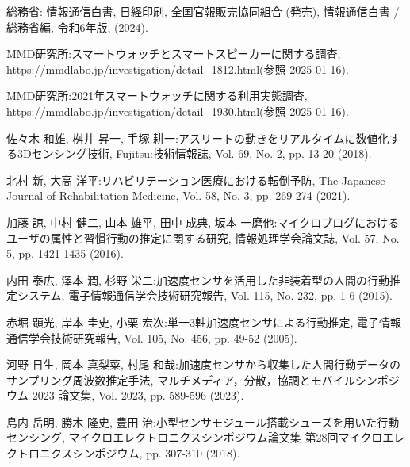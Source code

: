 \thispagestyle{myheadings}
    
\begin{thebibliography}{参考文献}

	総務省: 情報通信白書, 日経印刷, 全国官報販売協同組合 (発売), 情報通信白書 / 総務省編, 令和6年版, (2024).


	MMD研究所:スマートウォッチとスマートスピーカーに関する調査, \url{https://mmdlabo.jp/investigation/detail_1812.html}(参照 2025-01-16).

	MMD研究所:2021年スマートウォッチに関する利用実態調査, \url{https://mmdlabo.jp/investigation/detail_1930.html}(参照 2025-01-16).

	佐々木 和雄, 桝井 昇一, 手塚 耕一:アスリートの動きをリアルタイムに数値化する3Dセンシング技術, Fujitsu:技術情報誌, Vol. 69, No. 2, pp. 13-20 (2018).

	北村 新, 大高 洋平:リハビリテーション医療における転倒予防, The Japanese Journal of Rehabilitation Medicine, Vol. 58, No. 3, pp. 269-274 (2021).
	

	加藤 諒, 中村 健二, 山本 雄平, 田中 成典, 坂本 一磨他:マイクロブログにおけるユーザの属性と習慣行動の推定に関する研究, 情報処理学会論文誌, Vol. 57, No. 5, pp. 1421-1435 (2016).

	内田 泰広, 澤本 潤, 杉野 栄二:加速度センサを活用した非装着型の人間の行動推定システム, 電子情報通信学会技術研究報告, Vol. 115, No. 232, pp. 1-6 (2015).

	赤堀 顕光, 岸本 圭史, 小栗 宏次:単一3軸加速度センサによる行動推定, 電子情報通信学会技術研究報告, Vol. 105, No. 456, pp. 49-52 (2005).

	河野 日生, 岡本 真梨菜, 村尾 和哉:加速度センサから収集した人間行動データのサンプリング周波数推定手法, マルチメディア，分散，協調とモバイルシンポジウム 2023 論文集, Vol. 2023, pp. 589-596 (2023).

	島内 岳明, 勝木 隆史, 豊田 治:小型センサモジュール搭載シューズを用いた行動センシング, マイクロエレクトロニクスシンポジウム論文集 第28回マイクロエレクトロニクスシンポジウム, pp. 307-310 (2018).


\end{thebibliography}
